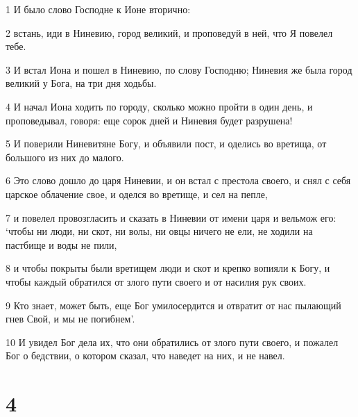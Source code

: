 \par 1 И было слово Господне к Ионе вторично:
\par 2 встань, иди в Ниневию, город великий, и проповедуй в ней, что Я повелел тебе.
\par 3 И встал Иона и пошел в Ниневию, по слову Господню; Ниневия же была город великий у Бога, на три дня ходьбы.
\par 4 И начал Иона ходить по городу, сколько можно пройти в один день, и проповедывал, говоря: еще сорок дней и Ниневия будет разрушена!
\par 5 И поверили Ниневитяне Богу, и объявили пост, и оделись во вретища, от большого из них до малого.
\par 6 Это слово дошло до царя Ниневии, и он встал с престола своего, и снял с себя царское облачение свое, и оделся во вретище, и сел на пепле,
\par 7 и повелел провозгласить и сказать в Ниневии от имени царя и вельмож его: `чтобы ни люди, ни скот, ни волы, ни овцы ничего не ели, не ходили на пастбище и воды не пили,
\par 8 и чтобы покрыты были вретищем люди и скот и крепко вопияли к Богу, и чтобы каждый обратился от злого пути своего и от насилия рук своих.
\par 9 Кто знает, может быть, еще Бог умилосердится и отвратит от нас пылающий гнев Свой, и мы не погибнем'.
\par 10 И увидел Бог дела их, что они обратились от злого пути своего, и пожалел Бог о бедствии, о котором сказал, что наведет на них, и не навел.

\chapter{4}

